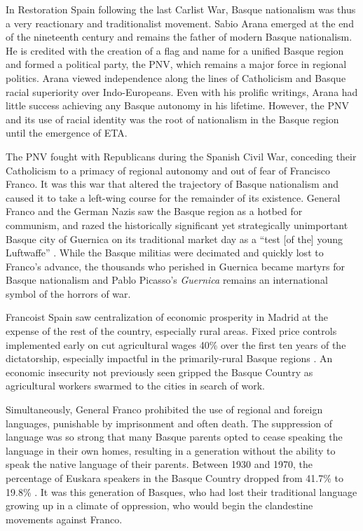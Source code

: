 \documentclass[basque,american]{../../../coursework}
\begin{document}
In Restoration Spain following the last Carlist War, Basque nationalism was
thus a very reactionary and traditionalist movement. Sabio Arana emerged at
the end of the nineteenth century and remains the father of modern Basque
nationalism. He is credited with the creation of a flag and name for a
unified Basque region and formed a political party, the PNV, which remains a
major force in regional politics. Arana viewed independence along the lines of
Catholicism and Basque racial superiority over Indo-Europeans. Even with his
prolific writings, Arana had little success achieving any Basque autonomy in
his lifetime. However, the PNV and its use of racial identity was the root of
nationalism in the Basque region until the emergence of ETA.

The PNV fought with Republicans during the Spanish Civil War, conceding their
Catholicism to a primacy of regional autonomy and out of fear of Francisco
Franco. It was this war that altered the trajectory of Basque nationalism and
caused it to take a left-wing course for the remainder of its existence.
General Franco and the German Nazis saw the Basque region as a hotbed for
communism, and razed the historically significant yet strategically
unimportant Basque city of Guernica on its traditional market day as a
\enquote{test [of the] young Luftwaffe} \parencite{Goring1946}. While the
Basque militias were decimated and quickly lost to Franco's advance, the
thousands who perished in Guernica became martyrs for Basque nationalism and
Pablo Picasso's \emph{Guernica} remains an international symbol of the horrors
of war.

Francoist Spain saw centralization of economic prosperity in Madrid at the
expense of the rest of the country, especially rural areas. Fixed price
controls implemented early on cut agricultural wages 40\% over the first ten
years of the dictatorship, especially impactful in the primarily-rural Basque
regions \parencite[169]{Watson2007}. An economic insecurity not previously
seen gripped the Basque Country as agricultural workers swarmed to the cities
in search of work.

Simultaneously, General Franco prohibited the use of regional and foreign
languages, punishable by imprisonment and often death. The suppression of
language was so strong that many Basque parents opted to cease speaking the
language in their own homes, resulting in a generation without the ability to
speak the native language of their parents. Between 1930 and 1970, the
percentage of \foreignlanguage{basque}{Euskara} speakers in the Basque Country
dropped from 41.7\% to 19.8\% \parencite{Clark1981}. It was this generation of
Basques, who had lost their traditional language growing up in a climate of
oppression, who would begin the clandestine movements against Franco.
\end{document}
